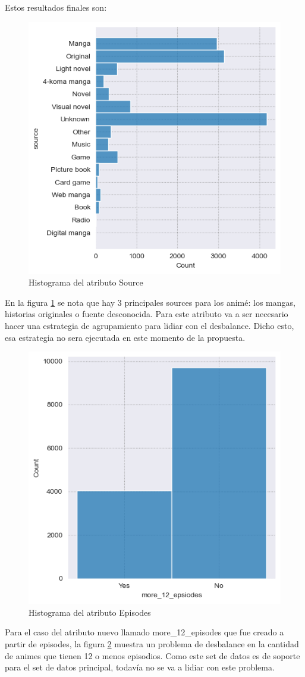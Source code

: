 \documentclass[a4paper]{article}
\begin{document}
Estos resultados finales son:

\begin{figure}[hbtp!]
    \centering
    \includegraphics[width=0.5\linewidth]{Module_4_BigData//Proyecto//Propuestas//Imagenes/p2_dataset1_source_histogram.png}
    \caption{Histograma del atributo Source}
    \label{fig:hist_p2_dataset1_source}
\end{figure}

En la figura \ref{fig:hist_p2_dataset1_source} se nota que hay 3 principales sources para los animé: los mangas, historias originales o fuente desconocida. Para este atributo va a ser necesario hacer una estrategia de agrupamiento para lidiar con el desbalance. Dicho esto, esa estrategia no sera ejecutada en este momento de la propuesta.

\begin{figure}[hbtp!]
    \centering
    \includegraphics[width=0.5\linewidth]{Module_4_BigData//Proyecto//Propuestas//Imagenes/p2_dataset1_episodes_histogram.png}
    \caption{Histograma del atributo Episodes}
    \label{fig:hist_p2_dataset1_episodes}
\end{figure}

Para el caso del atributo nuevo llamado more\_12\_episodes que fue creado a partir de episodes, la figura \ref{fig:hist_p2_dataset1_episodes} muestra un problema de desbalance en la cantidad de animes que tienen 12 o menos episodios. Como este set de datos es de soporte para el set de datos principal, todavía no se va a lidiar con este problema.
\end{document}
